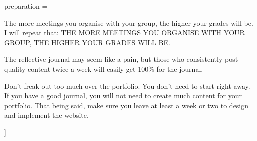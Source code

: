 preparation = {
    \item The more meetings you organise with your group, the higher your grades will be. I will repeat that: THE MORE MEETINGS YOU ORGANISE WITH YOUR GROUP, THE HIGHER YOUR GRADES WILL BE.
    \item The reflective journal may seem like a pain, but those who consistently post quality content twice a week will easily get 100\% for the journal.
    \item Don't freak out too much over the portfolio. You don't need to start right away. If you have a good journal, you will not need to create much content for your portfolio. That being said, make sure you leave at least a week or two to design and implement the website.
}]{}
